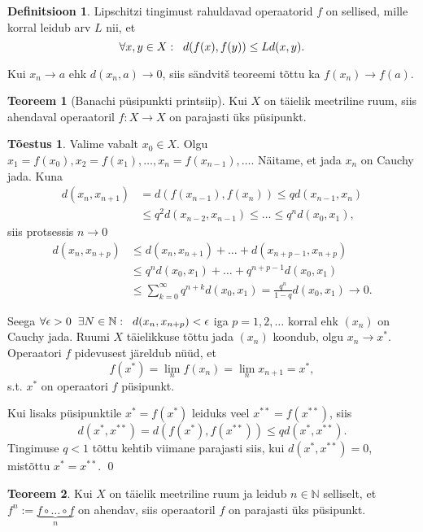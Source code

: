 \documentclass{article}[12pt]
\newcommand{\h}{\hspace{0.2cm}}
\newcommand{\N}{\mathbb{N}}
\theoremstyle{definition}
\newtheorem{definition}{Definitsioon}[section]
\theoremstyle{definition}
\newtheorem{theorem}{Teoreem}[section]
\theoremstyle{definition}
\theoremstyle{break}
\newtheorem*{toestus}{Tõestus}
\begin{document}
\begin{definition}
	Lipschitzi tingimust rahuldavad operaatorid $f$ on sellised, mille korral leidub arv $L$ nii, et
	\[
		\forall x,y\in X:\h d(f(x),f(y)) \leq Ld(x,y).
	\]	
\end{definition}

Kui $x_n\rightarrow a$ ehk $d(x_n,a)\rightarrow 0$, siis sändvitš teoreemi tõttu ka $f(x_n)\rightarrow f(a)$.

\begin{theorem}[Banachi püsipunkti printsiip]
	Kui $X$ on täielik meetriline ruum, siis ahendaval operaatoril $f:X\rightarrow X$ on parajasti üks püsipunkt.
\end{theorem}

\begin{toestus}
	Valime vabalt $x_0\in X$.
	Olgu $x_1 = f(x_0), x_2 = f(x_1), \dots, x_n = f(x_{n-1}),\dots$.
	Näitame, et jada $x_n$ on Cauchy jada.
	Kuna
	\begin{align*}
		d(x_n,x_{n+1}) &= d(f(x_{n-1}), f(x_n)) \leq qd(x_{n-1},x_n) \\
		&\leq q^2 d(x_{n-2}, x_{n-1}) \leq \dots \leq q^n d(x_0,x_1),
	\end{align*}
	siis protsessis $n\rightarrow 0$
	\begin{align*}
		d(x_n,x_{n+p}) &\leq d(x_n,x_{n+1}) + \dots + d(x_{n+p-1}, x_{n+p}) \\
		&\leq q^n d(x_0,x_1) + \dots + q^{n+p-1}d(x_0,x_1) \\
		&\leq \sum_{k=0}^\infty q^{n+k} d(x_0,x_1) = \frac{q^n}{1-q} d(x_0,x_1) \rightarrow 0.
	\end{align*}

	Seega $\forall \epsilon > 0\h\exists N\in \N:\h d(x_n,x_{n+p})<\epsilon$ iga $p = 1,2,\dots$ korral ehk $(x_n)$ on Cauchy jada.
	Ruumi $X$ täielikkuse tõttu jada $(x_n)$ koondub, olgu $x_n\rightarrow x^*$.
	Operaatori $f$ pidevusest järeldub nüüd, et
	\[
		f(x^*) = \lim_n f(x_n) = \lim_n x_{n+1} = x^*,
	\]
	s.t. $x^*$ on operaatori $f$ püsipunkt.

	Kui lisaks püsipunktile $x^* = f(x^*)$ leiduks veel $x^{**} = f(x^{**})$, siis
	\[
		d(x^*, x^{**}) = d(f(x^*), f(x^{**})) \leq qd(x^*, x^{**}).
	\]
	Tingimuse $q < 1$ tõttu kehtib viimane parajasti siis, kui $d(x^*, x^{**}) = 0$, mistõttu $x^* = x^{**}$.
	\qed
\end{toestus}

\begin{theorem}
	Kui $X$ on täielik meetriline ruum ja leidub $n\in \N$ selliselt, et $f^n := \underbrace{f\circ\dots\circ f}_n$ on ahendav, siis operaatoril $f$ on parajasti üks püsipunkt.
\end{theorem}
\end{document}
